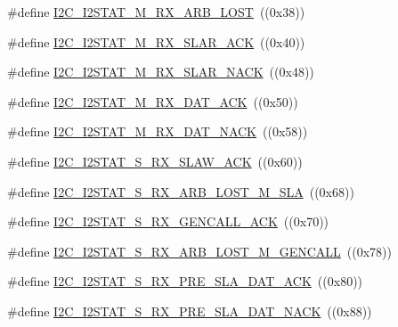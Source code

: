 \begin{DoxyCompactItemize}
\item 
\#define \hyperlink{group___i2_c__18_x_x__43_x_x_gaed32dea40cf84a1efb09e0c389579163}{I2\+C\+\_\+\+I2\+S\+T\+A\+T\+\_\+\+M\+\_\+\+R\+X\+\_\+\+A\+R\+B\+\_\+\+L\+O\+ST}~((0x38))
\item 
\#define \hyperlink{group___i2_c__18_x_x__43_x_x_gacd29e4a94f8a533477dbbf026c0d525a}{I2\+C\+\_\+\+I2\+S\+T\+A\+T\+\_\+\+M\+\_\+\+R\+X\+\_\+\+S\+L\+A\+R\+\_\+\+A\+CK}~((0x40))
\item 
\#define \hyperlink{group___i2_c__18_x_x__43_x_x_gafe156febe3313a9f3423776f97d0f24f}{I2\+C\+\_\+\+I2\+S\+T\+A\+T\+\_\+\+M\+\_\+\+R\+X\+\_\+\+S\+L\+A\+R\+\_\+\+N\+A\+CK}~((0x48))
\item 
\#define \hyperlink{group___i2_c__18_x_x__43_x_x_ga2f07d3cfad351ba3c976d629db20cea2}{I2\+C\+\_\+\+I2\+S\+T\+A\+T\+\_\+\+M\+\_\+\+R\+X\+\_\+\+D\+A\+T\+\_\+\+A\+CK}~((0x50))
\item 
\#define \hyperlink{group___i2_c__18_x_x__43_x_x_ga9cc5203175775bfa5ae6df5d6d98b014}{I2\+C\+\_\+\+I2\+S\+T\+A\+T\+\_\+\+M\+\_\+\+R\+X\+\_\+\+D\+A\+T\+\_\+\+N\+A\+CK}~((0x58))
\item 
\#define \hyperlink{group___i2_c__18_x_x__43_x_x_ga7055c4b55feda352df8016cbca0c270b}{I2\+C\+\_\+\+I2\+S\+T\+A\+T\+\_\+\+S\+\_\+\+R\+X\+\_\+\+S\+L\+A\+W\+\_\+\+A\+CK}~((0x60))
\item 
\#define \hyperlink{group___i2_c__18_x_x__43_x_x_gaf13df6ed7d10be0e063bcbc04d329749}{I2\+C\+\_\+\+I2\+S\+T\+A\+T\+\_\+\+S\+\_\+\+R\+X\+\_\+\+A\+R\+B\+\_\+\+L\+O\+S\+T\+\_\+\+M\+\_\+\+S\+LA}~((0x68))
\item 
\#define \hyperlink{group___i2_c__18_x_x__43_x_x_gadcab34e87ad115c011e23a5bd4fb8aa3}{I2\+C\+\_\+\+I2\+S\+T\+A\+T\+\_\+\+S\+\_\+\+R\+X\+\_\+\+G\+E\+N\+C\+A\+L\+L\+\_\+\+A\+CK}~((0x70))
\item 
\#define \hyperlink{group___i2_c__18_x_x__43_x_x_ga1605c253472e071e7f77e51bda156ba7}{I2\+C\+\_\+\+I2\+S\+T\+A\+T\+\_\+\+S\+\_\+\+R\+X\+\_\+\+A\+R\+B\+\_\+\+L\+O\+S\+T\+\_\+\+M\+\_\+\+G\+E\+N\+C\+A\+LL}~((0x78))
\item 
\#define \hyperlink{group___i2_c__18_x_x__43_x_x_ga4342227592c3e2e345517bd3e6cd8089}{I2\+C\+\_\+\+I2\+S\+T\+A\+T\+\_\+\+S\+\_\+\+R\+X\+\_\+\+P\+R\+E\+\_\+\+S\+L\+A\+\_\+\+D\+A\+T\+\_\+\+A\+CK}~((0x80))
\item 
\#define \hyperlink{group___i2_c__18_x_x__43_x_x_gace56a90d55426cc6ab2a4ca540c63d02}{I2\+C\+\_\+\+I2\+S\+T\+A\+T\+\_\+\+S\+\_\+\+R\+X\+\_\+\+P\+R\+E\+\_\+\+S\+L\+A\+\_\+\+D\+A\+T\+\_\+\+N\+A\+CK}~((0x88))
\item 

\end{DoxyCompactItemize}

